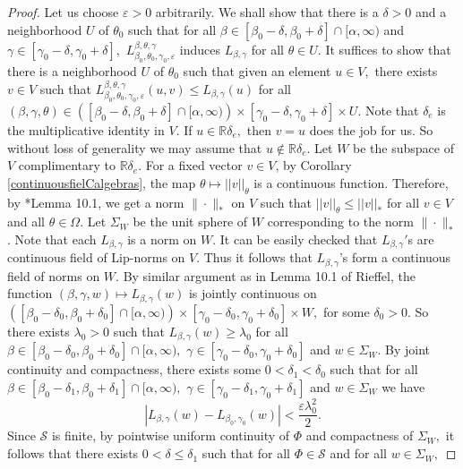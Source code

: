 \documentclass[a4paper,11pt,reqno]{amsart}
\theoremstyle{plain}
\theoremstyle{mainthmstyle}
\theoremstyle{named}
\numberwithin{equation}{section}
\begin{document}
\begin{proof}
Let us choose $\varepsilon > 0$ arbitrarily. We shall show that there is a $\delta>0$ and a neighborhood $U$ of $\theta_0$ such that for all $\beta\in[\beta_0-\delta,\beta_0+\delta] \cap [\alpha, \infty)$ and $\gamma\in[\gamma_0-\delta,\gamma_0+\delta],$  $L_{\beta_0, \theta_0, \gamma_0, \varepsilon}^{\beta,\theta,\gamma}$ induces $L_{\beta, \gamma}$ for all $\theta\in U$. It suffices to show that there is a neighborhood $U$ of $\theta_0$ such that given an element $u \in V,$ there exists $v \in V$ such that $L_{\beta_0, \theta_0, \gamma_0, \varepsilon}^{\beta,\theta,\gamma} (u, v) \leq L_{\beta,\gamma} (u)$ for all $(\beta,\gamma,\theta)\in \left ([\beta_0-\delta,\beta_0+\delta] \cap [\alpha, \infty) \right ) \times [\gamma_0-\delta,\gamma_0+\delta]\times U$. Note that $\delta_e$ is the multiplicative identity in $V.$ If $u \in \mathbb R \delta_e,$ then $v = u$ does the job for us. So without loss of generality we may assume that $u \notin \mathbb R \delta_e.$ Let $W$ be the subspace of $V$ complimentary to $\mathbb R \delta_e$. For a fixed vector $v\in V$, by Corollary \ref{continuousfielCalgebras}, the map $\theta\mapsto\lvert\lvert v\rvert\rvert_{\theta}$ is a continuous function. Therefore, by \cite{Rieffel-Gromov}*{Lemma 10.1}, we get a norm $\|\cdot\|_{\ast}$ on $V$ such that $\lvert\lvert v\rvert\rvert_{\theta}\leq \lvert\lvert v\rvert\rvert_{\ast}$ for all $v\in V$ and all $\theta \in \Omega.$ Let $\Sigma_W$ be the unit sphere of $W$ corresponding to the norm $\|\cdot\|_{\ast}$. Note that each $L_{\beta,\gamma}$ is a norm on $W.$ It can be easily checked that $L_{\beta,\gamma}'$s are continuous field of Lip-norms on $V.$ Thus it follows that $L_{\beta,\gamma}$'s form a continuous field of norms on $W.$ By similar argument as in Lemma 10.1 of Rieffel, the function $(\beta, \gamma, w) \mapsto L_{\beta,\gamma} (w)$ is jointly continuous on $\left (\left [\beta_0 - \delta_0, \beta_0 + \delta_0 \right ] \cap [\alpha, \infty) \right ) \times \left [\gamma_0 - \delta_0, \gamma_0 + \delta_0 \right ] \times W,$ for some $\delta_0>0$. So there exists $\lambda_0 > 0$ such that $L_{\beta, \gamma} (w) \geq \lambda_0$ for all $\beta \in \left [\beta_0 - \delta_0, \beta_0 + \delta_0 \right ] \cap [\alpha, \infty),$ $\gamma \in \left [\gamma_0 - \delta_0, \gamma_0 + \delta_0 \right ]$ and $w \in \Sigma_W.$ By joint continuity and compactness, there exists some $0 < \delta_1 < \delta_0$ such that for all $\beta \in \left [\beta_0 - \delta_1, \beta_0 + \delta_1 \right ] \cap [\alpha, \infty),$ $\gamma \in \left [\gamma_0 - \delta_1, \gamma_0 + \delta_1 \right ]$ and $w \in \Sigma_W$ we have $$\left \lvert L_{\beta, \gamma} (w) - L_{\beta_0, \gamma_0} (w) \right \rvert < \frac {\varepsilon \lambda_0^{2}} {2}.$$ Since $\mathcal S$ is finite, by pointwise uniform continuity of $\Phi$ and compactness of $\Sigma_W,$ it follows that there exists $0 < \delta \leq \delta_1$ such that for all $\Phi \in \mathcal S$ and for all $w \in \Sigma_W,$ 

\end{proof}
\end{document}
